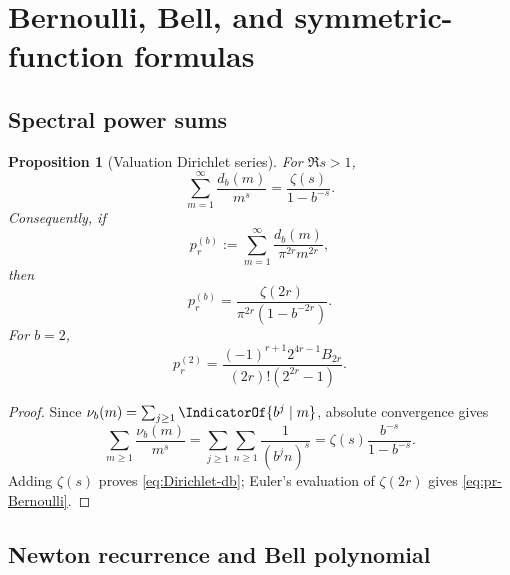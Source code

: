 \documentclass[11pt]{article}
\newtheorem{proposition}[theorem]{Proposition}
\theoremstyle{definition}
\theoremstyle{remark}
\begin{document}
\section{Bernoulli, Bell, and symmetric-function formulas}

\subsection{Spectral power sums}

\begin{proposition}[Valuation Dirichlet series]\label{prop:Dirichlet}
For \(\Re s>1\),
\begin{equation}\label{eq:Dirichlet-db}
  \sum_{m=1}^{\infty}\frac{d_b(m)}{m^s}
  =\frac{\zeta(s)}{1-b^{-s}}.
\end{equation}
Consequently, if
\begin{equation}\label{eq:prb}
  p_r^{(b)}:=\sum_{m=1}^{\infty}
  \frac{d_b(m)}{\pi^{2r}m^{2r}},
\end{equation}
then
\begin{equation}\label{eq:pr-zeta}
  p_r^{(b)}=
  \frac{\zeta(2r)}{\pi^{2r}(1-b^{-2r})}.
\end{equation}
For \(b=2\),
\begin{equation}\label{eq:pr-Bernoulli}
  p_r^{(2)}=
  \frac{(-1)^{r+1}2^{4r-1}B_{2r}}
       {(2r)!(2^{2r}-1)}.
\end{equation}
\end{proposition}

\begin{proof}
Since
\(
\nu_b(m)=\sum_{j\ge1}\IndicatorOf{b^j\mid m}
\),
absolute convergence gives
\[
 \sum_{m\ge1}\frac{\nu_b(m)}{m^s}
 =\sum_{j\ge1}\sum_{n\ge1}\frac1{(b^jn)^s}
 =\zeta(s)\frac{b^{-s}}{1-b^{-s}}.
\]
Adding \(\zeta(s)\) proves \eqref{eq:Dirichlet-db}; Euler's evaluation of \(\zeta(2r)\) gives \eqref{eq:pr-Bernoulli}.
\end{proof}

\subsection{Newton recurrence and Bell polynomial}
\end{document}
